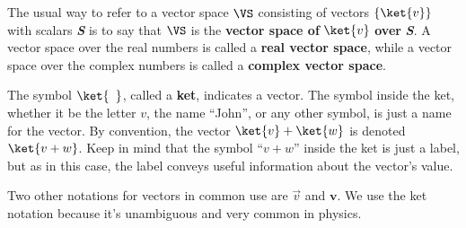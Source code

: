 The usual way to refer to a vector space $\VS$ consisting of vectors $\{\ket{v}\}$ with scalars \textit{\textbf{S}} is to say that $\VS$ is the \textbf{vector space of} $\ket{v}$ \textbf{over} \textit{\textbf{S}}.
A vector space over the real numbers is called a \textbf{real vector space}, while a vector space over the complex numbers is called a \textbf{complex vector space}.

The symbol $\ket{\phantom{v}}$, called a \textbf{ket}, indicates a vector.
The symbol inside the ket, whether it be the letter $v$, the name ``John'', or any other symbol, is just a name for the vector.
By convention, the vector $\ket{v} + \ket{w}$ is denoted $\ket{v+w}$.
Keep in mind that the symbol ``$v+w$'' inside the ket is just a label, but as in this case, the label conveys useful information about the vector's value.

Two other notations for vectors in common use are $\vec{v}$ and $\mathbf{v}$.
We use the ket notation because it's unambiguous and very common in physics.


